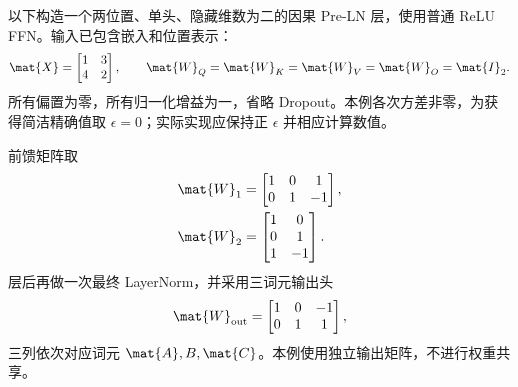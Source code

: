 \documentclass[../textbook.tex]{subfiles}
\begin{document}
\begin{example}
以下构造一个两位置、单头、隐藏维数为二的因果 Pre-LN 层，使用普通 ReLU FFN。输入已包含嵌入和位置表示：
\begin{equation*}
 \mat{X}=\begin{bmatrix}1&3\\4&2\end{bmatrix},\qquad
 \mat{W}_Q=\mat{W}_K=\mat{W}_V=\mat{W}_O=\mat{I}_2.
\end{equation*}
所有偏置为零，所有归一化增益为一，省略 Dropout。本例各次方差非零，为获得简洁精确值取 $\epsilon=0$；实际实现应保持正 $\epsilon$ 并相应计算数值。

前馈矩阵取
\begin{align*}
 \mat{W}_1&=\begin{bmatrix}1&0&1\\0&1&-1\end{bmatrix},\\
 \mat{W}_2&=\begin{bmatrix}1&0\\0&1\\1&-1\end{bmatrix}.
\end{align*}
层后再做一次最终 LayerNorm，并采用三词元输出头
\begin{equation*}
 \mat{W}_{\mathrm{out}}=\begin{bmatrix}1&0&-1\\0&1&1\end{bmatrix},
\end{equation*}
三列依次对应词元 $\mat{A},B,\mat{C}$。本例使用独立输出矩阵，不进行权重共享。


\end{example}
\end{document}
